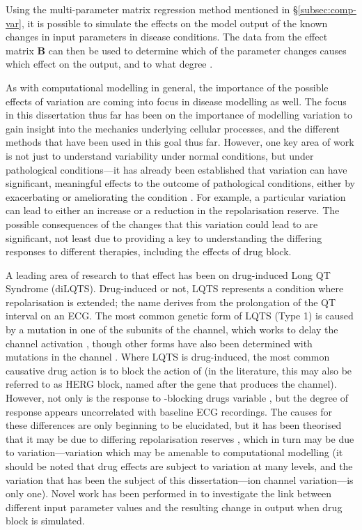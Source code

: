 \documentclass[../thesis-main.tex]{subfiles}
\begin{document}
Using the multi-parameter matrix regression method mentioned in \S\ref{subsec:comp-var}, it is possible to simulate the effects on the model output of the known changes in input parameters in disease conditions. The data from the effect matrix $\mathbf{B}$ can then be used to determine which of the parameter changes causes which effect on the output, and to what degree \citep{Sarkar2012}.

As with computational modelling in general, the importance of the possible effects of variation are coming into focus in disease modelling as well. The focus in this dissertation thus far has been on the importance of modelling variation to gain insight into the mechanics underlying cellular processes, and the different methods that have been used in this goal thus far. However, one key area of work is not just to understand variability under normal conditions, but under pathological conditions---it has already been established that variation can have significant, meaningful effects to the outcome of pathological conditions, either by exacerbating or ameliorating the condition \citep{Sarkar2012, John2012}. For example, a particular variation can lead to either an increase or a reduction in the repolarisation reserve. The possible consequences of the changes that this variation could lead to are significant, not least due to providing a key to understanding the differing responses to different therapies, including the effects of drug block.

A leading area of research to that effect has been on drug-induced Long QT Syndrome (diLQTS). Drug-induced or not, LQTS represents a condition where repolarisation is extended; the name derives from the prolongation of the QT interval on an ECG. The most common genetic form of LQTS (Type 1) is caused by a mutation in one of the subunits of the \iks{} channel, which works to delay the channel activation \citep{Jons2011, Hoefen2012, Jou2013}, though other forms have also been determined with mutations in the \ina{} channel \citep{Hashambhoy2011}. Where LQTS is drug-induced, the most common causative drug action is to block the action of \ikr{} (in the literature, this may also be referred to as HERG block, named after the gene that produces the channel). However, not only is the response to \ikr{}-blocking drugs variable \citep{Kannankeril2010}, but the degree of response appears uncorrelated with baseline ECG recordings. The causes for these differences are only beginning to be elucidated, but it has been theorised that it may be due to differing repolarisation reserves \citep{Varro2011}, which in turn may be due to variation---variation which may be amenable to computational modelling (it should be noted that drug effects are subject to variation at many levels, and the variation that has been the subject of this dissertation---ion channel variation---is only one). Novel work has been performed in \citet{Sarkar2011} to investigate the link between different input parameter values and the resulting change in output when drug block is simulated.
\end{document}
